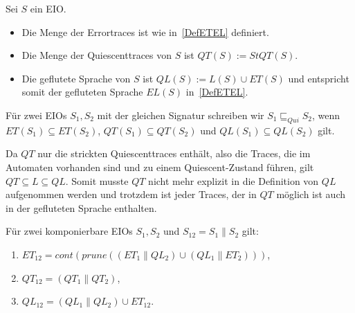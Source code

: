 \begin{Def}
  \label{DefQTQL}
  Sei $S$ ein EIO.
  \begin{itemize}
    \item Die Menge der Errortraces ist wie in~\ref{DefETEL} definiert.
    \item Die Menge der Quiescenttraces von $S$ ist $QT(S) := StQT(S)$.
    \item Die geflutete Sprache von $S$ ist $QL(S):=L(S)\cup ET(S)$
      und entspricht somit der gefluteten Sprache $EL(S)$
      in~\ref{DefETEL}.
  \end{itemize}
  Für zwei EIOs $S_1, S_2$ mit der gleichen Signatur schreiben wir
  $S_1\sqsubseteq _{Qui} S_2$, wenn $ET(S_1)\subseteq ET(S_2)$,
  $QT(S_1)\subseteq QT(S_2)$ und $QL(S_1)\subseteq QL(S_2)$ gilt.
\end{Def}

Da $QT$ nur die strickten Quiescenttraces enthält, also die Traces, die im
Automaten vorhanden sind und zu einem Quiescent-Zustand führen, gilt
$QT\subseteq L\subseteq QL$. Somit musste $QT$ nicht mehr explizit in die
Definition von $QL$ aufgenommen werden und trotzdem ist jeder Traces, der in
$QT$ möglich ist auch in der gefluteten Sprache enthalten.

\begin{satz}
  \label{satzQuiSemantik}
  Für zwei komponierbare EIOs $S_1, S_2$ und $S_{12} = S_1\|S_2$ gilt:
  \begin{enumerate}
    \item $ET_{12} = cont(prune((ET_1\|QL_2)\cup (QL_1\|ET_2)))$,
    \item $QT_{12} = (QT_1\|QT_2)$,%
    \item $QL_{12} = (QL_1\|QL_2)\cup ET_{12}$.%
  \end{enumerate}
\end{satz}

